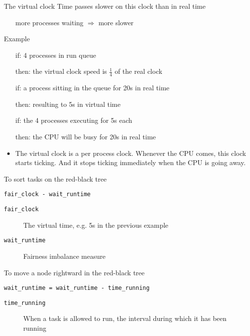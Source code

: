 \begin{frame}{The virtual clock}
  Time passes slower on this clock than in real time
  \begin{itemize}
  \item[] more processes waiting $\Rightarrow$ more slower
  \end{itemize}
  \begin{block}{Example}
    \begin{itemize}
    \item[if:] 4 processes in run queue
    \item[then:] the virtual clock speed is $\frac{1}{4}$ of the real clock
    \item[if:] a process sitting in the queue for 20s in real time
    \item[then:] resulting to 5s in virtual time
    \item[if:] the 4 processes executing for 5s each
    \item[then:] the CPU will be busy for 20s in real time
    \end{itemize}
  \end{block}
\end{frame}

\begin{itemize}
\item The virtual clock is a per process clock. Whenever the CPU comes, this
  clock starts ticking. And it stops ticking immediately when the CPU is going away.
\end{itemize}

\begin{frame}
  \begin{block}{To sort tasks on the red-black tree}
    \begin{center}
      \texttt{fair\_clock - wait\_runtime}
    \end{center}
    \begin{description}
    \item[\texttt{fair\_clock}] The virtual time, e.g. 5s in the previous example
    \item[\texttt{wait\_runtime}] Fairness imbalance measure 
    \end{description}
  \end{block}
  \begin{block}{To move a node rightward in the red-black tree}
    \begin{center}
      \texttt{wait\_runtime = wait\_runtime - time\_running}
    \end{center}
    \begin{description}
    \item[\texttt{time\_running}] When a task is allowed to run, the interval during which
      it has been running
    \end{description}
  \end{block}
\end{frame}

